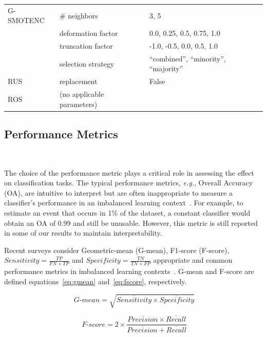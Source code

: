 \documentclass[preprint,12pt]{elsarticle}
\begin{document}
{\begin{table}[ht]
\begin{tabular}{lll}
		G-SMOTENC       & \# neighbors                     & 3, 5                           \\
                        & deformation factor               & 0.0, 0.25, 0.5, 0.75, 1.0      \\
                        & truncation factor                & -1.0, -0.5, 0.0, 0.5, 1.0      \\
                        & selection strategy               & ``combined'',
                        ``minority'', ``majority''\\
		RUS             & replacement                      & False                          \\
		ROS             & (no applicable parameters)       &                                \\
		\bottomrule
	\end{tabular}
\end{table}

\subsection{Performance Metrics}~\label{sec:performance_metrics}

The choice of the performance metric plays a critical role in assessing
the effect on classification tasks. The typical performance metrics,
\textit{e.g.}, Overall Accuracy (OA), are intuitive to interpret but are often
inappropriate to measure a classifier's performance in an imbalanced learning
context~\cite{sun2009classification}. For example, to estimate an event that
occurs in 1\% of the dataset, a constant classifier would obtain an OA of 0.99
and still be unusable. However, this metric is still reported in some of our
results to maintain interpretability.

Recent surveys consider Geometric-mean (G-mean), F1-score
(F-score), $Sensitivity = \frac{TP}{FN+TP}$ and $Specificity = \frac{TN}{TN +
FP}$ appropriate and common performance metrics in imbalanced learning
contexts~\cite{rout2018handling, jeni2013facing,
japkowicz2013assessment}. G-mean and F-score are defined
equations~\ref{eq:gmean} and~\ref{eq:fscore}, respectively.

\begin{equation}~\label{eq:gmean}
    \ensuremath{\textit{G-mean}} = \sqrt{\overline{Sensitivity} \times
    \overline{Specificity}}
\end{equation}

\begin{equation}~\label{eq:fscore}
    \ensuremath{\textit{F-score}} = 2\times\frac{\overline{Precision} \times
    \overline{Recall}}{\overline{Precision} + \overline{Recall}}
\end{equation}

}
\end{document}
